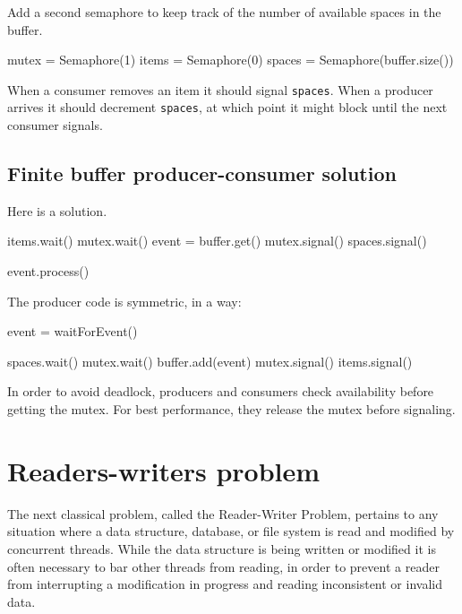 \documentclass{book}
\begin{document}
Add a second semaphore to keep track of the number of
available spaces in the buffer.

\begin{unbreakable}[title={Finite-buffer producer-consumer initialization}]{}
mutex = Semaphore(1)
items = Semaphore(0)
spaces = Semaphore(buffer.size())
\end{unbreakable}

When a consumer removes an item it should signal {\tt spaces}. When a producer arrives it should decrement {\tt spaces}, at which point it might block until the next consumer signals.



\subsection{Finite buffer producer-consumer solution}

Here is a solution.

\begin{unbreakable}[title={Finite buffer consumer solution}]{}
items.wait()
mutex.wait()
    event = buffer.get()
mutex.signal()
spaces.signal()

event.process()
\end{unbreakable}

The producer code is symmetric, in a way:

\begin{unbreakable}[title={Finite buffer producer solution}]{}
event = waitForEvent()

spaces.wait()
mutex.wait()
    buffer.add(event)
mutex.signal()
items.signal()
\end{unbreakable}

In order to avoid deadlock, producers and consumers check
availability before getting the mutex.  For best performance,
they release the mutex before signaling.


\section{Readers-writers problem}

The next classical problem, called the Reader-Writer Problem, pertains
to any situation where a data structure, database, or file system is
read and modified by concurrent threads.  While the data structure is
being written or modified it is often necessary to bar other threads
from reading, in order to prevent a reader from interrupting a
modification in progress and reading inconsistent or invalid data.
\end{document}

